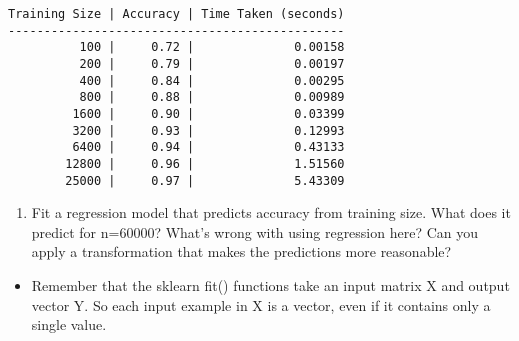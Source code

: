 \documentclass[11pt]{article}
\providecommand{\tightlist}{%
      \setlength{\itemsep}{0pt}\setlength{\parskip}{0pt}}
\begin{document}
    \begin{Verbatim}[commandchars=\\\{\}]
Training Size | Accuracy | Time Taken (seconds)
-----------------------------------------------
          100 |     0.72 |              0.00158
          200 |     0.79 |              0.00197
          400 |     0.84 |              0.00295
          800 |     0.88 |              0.00989
         1600 |     0.90 |              0.03399
         3200 |     0.93 |              0.12993
         6400 |     0.94 |              0.43133
        12800 |     0.96 |              1.51560
        25000 |     0.97 |              5.43309

    \end{Verbatim}

    \begin{enumerate}
\def\labelenumi{(\arabic{enumi})}
\setcounter{enumi}{3}
\tightlist
\item
  Fit a regression model that predicts accuracy from training size. What
  does it predict for n=60000? What's wrong with using regression here?
  Can you apply a transformation that makes the predictions more
  reasonable?
\end{enumerate}

\begin{itemize}
\tightlist
\item
  Remember that the sklearn fit() functions take an input matrix X and
  output vector Y. So each input example in X is a vector, even if it
  contains only a single value.
\end{itemize}
\end{document}
